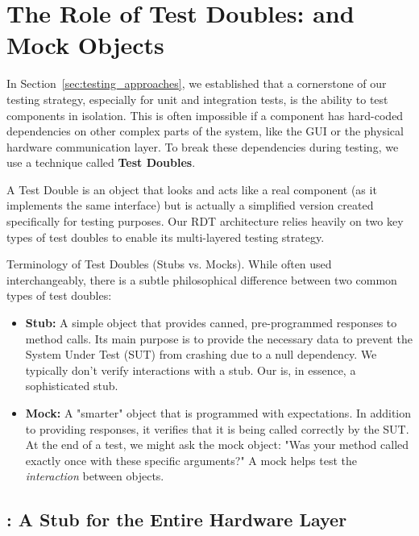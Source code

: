 \section{The Role of Test Doubles:  and Mock Objects}
\label{sec:test_doubles}

In Section~\ref{sec:testing_approaches}, we established that a cornerstone of our testing strategy, especially for unit and integration tests, is the ability to test components in isolation. This is often impossible if a component has hard-coded dependencies on other complex parts of the system, like the GUI or the physical hardware communication layer. To break these dependencies during testing, we use a technique called \textbf{Test Doubles}.

A Test Double is an object that looks and acts like a real component (as it implements the same interface) but is actually a simplified version created specifically for testing purposes. Our RDT architecture relies heavily on two key types of test doubles to enable its multi-layered testing strategy.

\begin{tipbox}{Terminology of Test Doubles (Stubs vs. Mocks).}
    While often used interchangeably, there is a subtle philosophical difference between two common types of test doubles:
    \begin{itemize}
        \item \textbf{Stub:} A simple object that provides canned, pre-programmed responses to method calls. Its main purpose is to provide the necessary data to prevent the System Under Test (SUT) from crashing due to a null dependency. We typically don't verify interactions with a stub. Our  is, in essence, a sophisticated stub.
        \item \textbf{Mock:} A "smarter" object that is programmed with expectations. In addition to providing responses, it verifies that it is being called correctly by the SUT. At the end of a test, we might ask the mock object: "Was your  method called exactly once with these specific arguments?" A mock helps test the \textit{interaction} between objects.
    \end{itemize}
\end{tipbox}

\subsection{: A Stub for the Entire Hardware Layer}
\label{subsec:fakemotioninterface_stub}

